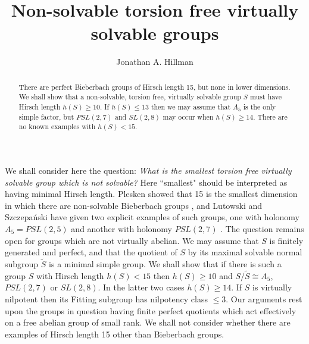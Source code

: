 \documentclass[12pt]{amsart}
\renewcommand{\geq}{\geqslant}
\renewcommand{\leq}{\leqslant}
\begin{document}
\title{Non-solvable torsion free virtually solvable groups}

\author{Jonathan A. Hillman }
\address{School of Mathematics and Statistics\\
     University of Sydney, NSW 2006\\
      Australia }


\begin{abstract}
There are perfect Bieberbach groups of Hirsch length 15,
but none in lower dimensions.
We shall show that a non-solvable, torsion free, 
virtually solvable group $S$ must have Hirsch length $h(S)\geq10$.
If $h(S)\leq13$ then we may assume that $A_5$ is the only simple factor,
but $PSL(2,7)$ and $SL(2,8)$ may occur when $h(S)\geq14$.
There are no known examples with $h(S)<15$.
\end{abstract}



\maketitle

We shall consider here the question:
{\sl What is the smallest torsion free virtually solvable group 
which is not solvable?}
Here ``smallest" should be interpreted as having minimal Hirsch length.
Plesken showed that 15 is the smallest dimension in which there are 
non-solvable Bieberbach groups \cite{Pl89},
and Lutowski and Szczepa\'nski have given two explicit examples 
of such groups,
one with holonomy $A_5=PSL(2,5)$ and another with holonomy $PSL(2,7)$ \cite{LuS}.
The question remains open for groups which are not virtually abelian. 
We may assume that $S$ is finitely generated and perfect, 
and that the quotient of $S$ by its maximal solvable normal subgroup $\widetilde{S}$ 
is a minimal simple group.
We shall show that if there is such a group $S$ with Hirsch length $h(S)<15$
then $h(S)\geq10$ and $S/\widetilde{S}\cong{A_5}$,  $PSL(2,7)$ or $SL(2,8)$.
In the latter two cases $h(S)\geq14$. 
If $S$ is virtually nilpotent then its Fitting subgroup has nilpotency class $\leq3$.
Our arguments rest upon the groups in question having finite perfect quotients 
which act effectively on a free abelian group of small rank. 
We shall not consider whether there are examples of Hirsch length 15 
other than Bieberbach groups.
\end{document}
